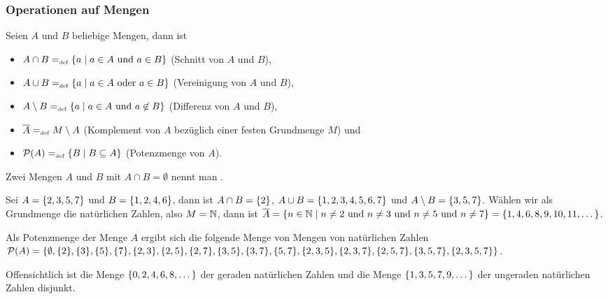 \subsubsection{Operationen auf Mengen}
\label{OpSetSect}

\begin{definition}
\label{OpSet}
Seien $A$ und $B$ beliebige Mengen, dann ist
\begin{itemize}
%
\item $A \cap B =_{\mathrm{\scriptscriptstyle def}} \{a \mid a \in A \text{ und } a \in B\}$
(Schnitt von $A$ und $B$)\index{$\cap$},
%
\item $A \cup B =_{\mathrm{\scriptscriptstyle def}} \{a \mid a \in A \text{ oder } a \in B\}$
(Vereinigung von $A$ und $B$)\index{$\cup$},
%
\item $A \setminus B =_{\mathrm{\scriptscriptstyle def}} \{a \mid a \in A \text{ und } a
\not\in B\}$ (Differenz von $A$ und $B$)\index{$\setminus$},
%
\item $\overline{A} =_{\mathrm{\scriptscriptstyle def}} M \setminus A$ (Komplement von $A$ 
bezüglich einer festen Grundmenge $M$) und
%
\item $\mathcal{P}(A) =_{\mathrm{\scriptscriptstyle def}} \{B \mid B \subseteq A\}$ (Potenzmenge von
$A$).
%
\end{itemize}
Zwei Mengen $A$ und $B$ mit $A \cap B = \emptyset$ nennt
man .

\begin{example}
Sei $A = \{2, 3, 5, 7\}$ und $B = \{1, 2, 4 , 6\}$, dann ist $A
\cap B = \{2\}$, $A \cup B = \{1, 2, 3, 4, 5, 6, \allowbreak 7\}$ und $A
\setminus B = \{3, 5, 7\}$. Wählen wir als Grundmenge die
natürlichen Zahlen, also $M = \mathbb N$, dann ist $\overline{A} = \{n \in \mathbb N
\mid n \not= 2 \text{ und } n \not= 3 \text{ und } n
\not= 5 \text{ und } n \not= 7\} = \{1, 4, 6, 8, 9, 10, 11,
\dots\}$. 

Als Potenzmenge der Menge $A$ ergibt sich die folgende Menge von Mengen
von natürlichen Zahlen $\mathcal{P}(A)
= \{\emptyset,\allowbreak \{2\},\allowbreak \{3\},
\allowbreak \{5\},\allowbreak \{7\}, \allowbreak \{2,3\},
\{2,5\}, \allowbreak \{2,7\}, \allowbreak \{3,5\}, \allowbreak\{3,7\},
\allowbreak \{5,7\},\allowbreak \{2,\allowbreak 3,5\},\allowbreak
\{2,3,7\},\allowbreak \{2,5,\allowbreak 7\}, \allowbreak \{3,\allowbreak 5,\allowbreak 7\},\{2,3,5,7\}\}$. 

Offensichtlich ist die Menge $\{0,2,4,6,8, \dots \}$ der geraden
natürlichen Zahlen und die Menge $\{1,3,5,7,9, \dots \}$ der
ungeraden natürlichen Zahlen disjunkt.
\end{example}
\end{definition}

